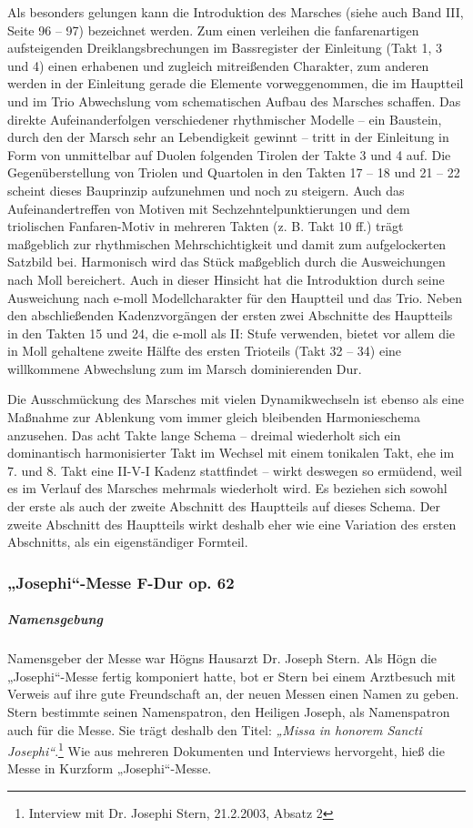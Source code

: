 \documentclass[a4paper]{article}
\newcommand\textstyleZitate[1]{\textit{#1}}
\begin{document}
Als besonders gelungen kann die Introduktion des Marsches (siehe auch
Band III, Seite 96 – 97) bezeichnet werden. Zum einen verleihen die
fanfarenartigen aufsteigenden Dreiklangsbrechungen im Bassregister der
Einleitung (Takt 1, 3 und 4) einen erhabenen und zugleich mitreißenden
Charakter, zum anderen werden in der Einleitung gerade die Elemente
vorweggenommen, die im Hauptteil und im Trio Abwechslung vom
schematischen Aufbau des Marsches schaffen. Das direkte
Aufeinanderfolgen verschiedener rhythmischer Modelle – ein Baustein,
durch den der Marsch sehr an Lebendigkeit gewinnt – tritt in der
Einleitung in Form von unmittelbar auf Duolen folgenden Tirolen der
Takte 3 und 4 auf. Die Gegenüberstellung von Triolen und Quartolen in
den Takten 17 – 18 und 21 – 22 scheint dieses Bauprinzip aufzunehmen
und noch zu steigern. Auch das Aufeinandertreffen von Motiven mit
Sechzehntelpunktierungen und dem triolischen Fanfaren-Motiv in mehreren
Takten (z. B. Takt 10 ff.) trägt maßgeblich zur rhythmischen
Mehrschichtigkeit und damit zum aufgelockerten Satzbild bei. Harmonisch
wird das Stück maßgeblich durch die Ausweichungen nach Moll bereichert.
Auch in dieser Hinsicht hat die Introduktion durch seine Ausweichung
nach e-moll Modellcharakter für den Hauptteil und das Trio. Neben den
abschließenden Kadenzvorgängen der ersten zwei Abschnitte des
Hauptteils in den Takten 15 und 24, die e-moll als II: Stufe verwenden,
bietet vor allem die in Moll gehaltene zweite Hälfte des ersten
Trioteils (Takt 32 – 34) eine willkommene Abwechslung zum im Marsch
dominierenden Dur.

Die Ausschmückung des Marsches mit vielen Dynamikwechseln ist ebenso als
eine Maßnahme zur Ablenkung vom immer gleich bleibenden Harmonieschema
anzusehen. Das acht Takte lange Schema – dreimal wiederholt sich ein
dominantisch harmonisierter Takt im Wechsel mit einem tonikalen Takt,
ehe im 7. und 8. Takt eine\newline
II-V-I Kadenz stattfindet – wirkt deswegen so ermüdend, weil es im
Verlauf des Marsches mehrmals wiederholt wird. Es beziehen sich sowohl
der erste als auch der zweite Abschnitt des Hauptteils auf dieses
Schema. Der zweite Abschnitt des Hauptteils wirkt deshalb eher wie eine
Variation des ersten Abschnitts, als ein eigenständiger Formteil.

\subsubsection[„Josephi“{}-Messe F{}-Dur op. 62]{„Josephi“-Messe F-Dur
op. 62}
\label{bkm:Ref98506951}\hypertarget{RefHeadingToc100333755}{}\label{bkm:Ref98506963}\label{bkm:Ref98506955}\subparagraph{Namensgebung}
Namensgeber der Messe war Högns Hausarzt Dr. Joseph Stern. Als Högn die
„Josephi“-Messe fertig komponiert hatte, bot er Stern bei einem
Arztbesuch mit Verweis auf ihre gute Freundschaft an, der neuen Messen
einen Namen zu geben. Stern bestimmte seinen Namenspatron, den Heiligen
Joseph, als Namenspatron auch für die Messe. Sie trägt deshalb den
Titel: \textstyleZitate{„Missa in honorem Sancti Josephi“}.\footnote{
Interview mit Dr. Josephi Stern, 21.2.2003, Absatz 2} Wie aus mehreren
Dokumenten und Interviews hervorgeht, hieß die Messe in Kurzform
„Josephi“-Messe.
\end{document}
